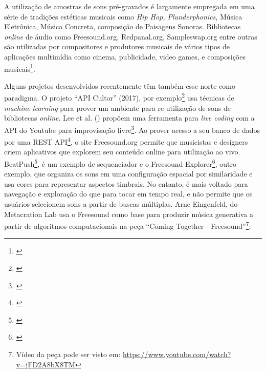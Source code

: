 
A utilização de amostras de sons pré-gravados é largamente empregada em uma série de tradições estéticas musicais como \emph{Hip Hop, Plunderphonics}, Música Eletrônica, Música Concreta, composição de Paisagens Sonoras. Bibliotecas \emph{online} de áudio como Freesound.org, Redpanal.org, Sampleswap.org entre outras são utilizadas por compositores e produtores musicais de vários tipos de aplicações multimídia como cinema, publicidade, video games, e composições musicais\footnote{\cite{Roma2013}}. 

Alguns projetos desenvolvidos recentemente têm também esse norte como paradigma. O projeto ``API Cultor'' (2017), por exemplo\footnote{\cite{Ordiales2017}} usa técnicas de \emph{machine learning} para prover um ambiente para re-utilização de sons de bibliotecas \emph{online}. Lee et al. (\citeyear{Lee}) propõem uma ferramenta para \emph{live coding} com a API do Youtube para improvisação livre\footnote{\cite{Lee}}. Ao prover acesso a seu banco de dados por uma REST API\footnote{\cite{Akkermans2011}}, o site Freesound.org permite que musicistas e designers criem aplicativos que explorem seu conteúdo online para utilização ao vivo. BeatPush\footnote{\cite{Feenstra2016}}, é um exemplo de sequenciador e o Freesound Explorer\footnote{\cite{Font2016}}, outro exemplo, que organiza os sons em uma configuração espacial por similaridade e usa cores para representar aspectos timbrais. No entanto, é mais voltado para navegação e exploração do que para tocar em tempo real, e não permite que os usuários selecionem sons a partir de buscas múltiplas. Arne Eingenfeld, do Metacration Lab usa o Freesound como base para produzir música generativa a partir de algoritmos computacionais na peça ``Coming Together - Freesound''\footnote{Vídeo da peça pode ser visto em: \url{https://www.youtube.com/watch?v=jFD2A8bX8TM}}:

